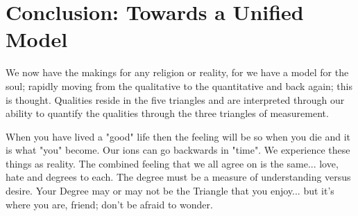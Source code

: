 \section{Conclusion: Towards a Unified Model}

We now have the makings for any religion or reality, for we have a model for the soul; rapidly moving from the qualitative to the quantitative and back again; this is thought. Qualities reside in the five triangles and are interpreted through our ability to quantify the qualities through the three triangles of measurement.

When you have lived a "good" life then the feeling will be so when you die and it is what "you" become. Our ions can go backwards in "time". We experience these things as reality. The combined feeling that we all agree on is the same... love, hate and degrees to each. The degree must be a measure of understanding versus desire. Your Degree may or may not be the Triangle that you enjoy... but it's where you are, friend; don't be afraid to wonder.